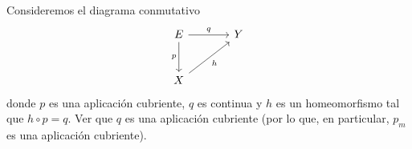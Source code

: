 \begin{ejercicio}
Consideremos el diagrama conmutativo
\[
\begin{tikzcd}[row sep=large, column sep=large]
E \arrow[r, "q"] \arrow[d, "p"'] & Y \\
X \arrow[ur, "h"'] &
\end{tikzcd}
\]
donde $p$ es una aplicación cubriente, $q$ es continua y $h$ es un homeomorfismo tal que $h \circ p = q$. Ver que $q$ es una aplicación cubriente (por lo que, en particular, $p_m$ es una aplicación cubriente).
\end{ejercicio}

\begin{demostracion}

\end{demostracion}
